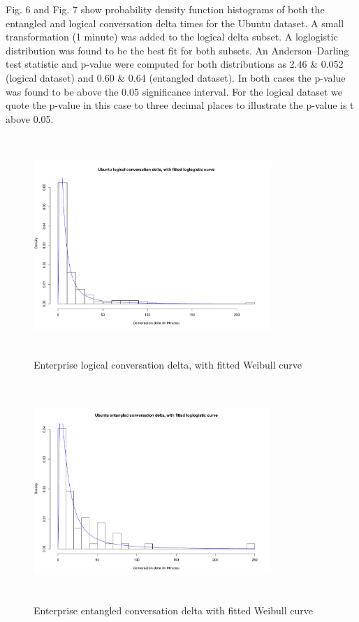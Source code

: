 \documentclass[conference]{IEEEtran}
\begin{document}
Fig. 6 and Fig. 7 show probability density function histograms of both the entangled and logical conversation delta times for the Ubuntu dataset. A small transformation (1 minute) was added to the logical delta subset. A loglogistic distribution was found to be the best fit for both subsets.  An Anderson--Darling test statistic and p-value were computed for both distributions as 2.46 \& 0.052 (logical dataset) and 0.60 \&  0.64 (entangled dataset). In both cases the p-value was found to be above the 0.05 significance interval. For the logical dataset we quote the p-value in this case to three decimal places to illustrate the p-value is t above 0.05.

\begin{figure}
\begin{center}
\includegraphics[height=8.3cm, width=9cm]{06_delta_logical_ubuntu.pdf} 
\caption{Enterprise logical conversation delta, with fitted Weibull curve}
\end{center}
\label{fig:delta_log_ubun}
\end{figure}

\begin{figure}
\begin{center}
\includegraphics[height=8.3cm, width=9cm]{07_delta_entangled_ubuntu.pdf} 
\caption{Enterprise entangled conversation delta with fitted Weibull curve}
\end{center}
\label{fig:delta_ent_ubun}
\end{figure}
\end{document}
